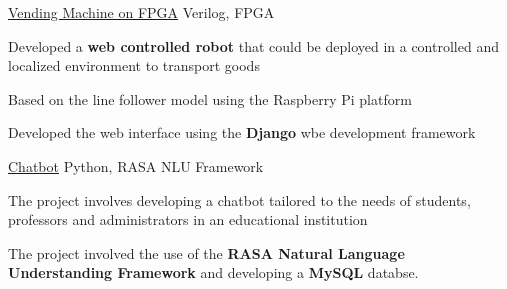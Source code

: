 \begin{cventries}
    \projects
    {} %
     {\href{}{Vending Machine on FPGA}} %
     {Verilog, FPGA} %
     {} %
     {
       \begin{cvitems} %
         \item {Developed a \textbf{web controlled robot} that could be deployed in a controlled and localized environment to transport goods}
         \item {Based on the line follower model using the Raspberry Pi platform}
         \item {Developed the web interface using the \textbf{Django} wbe development framework}
       \end{cvitems}
     }

  \projects
    {} %
    {\href{}{Chatbot}} %
    {Python, RASA NLU Framework} %
    {} %
    {
      \begin{cvitems} %
        \item {The project involves developing a chatbot tailored to the needs of students, professors and administrators in an educational institution}
        \item {The project involved the use of the \textbf{RASA Natural Language Understanding Framework} and developing a \textbf{MySQL} databse.}
      \end{cvitems}
    }

 


  


 


\end{cventries}
